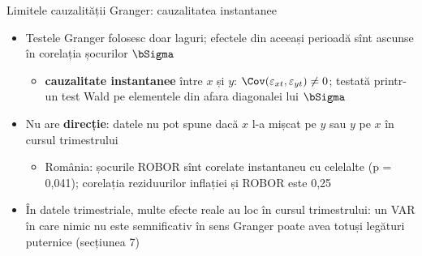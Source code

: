 \begin{frame}{Limitele cauzalității Granger: cauzalitatea instantanee}
\itemsize{\small}
\begin{itemize}
    \item Testele Granger folosesc doar laguri; efectele din aceeași perioadă sînt ascunse în corelația șocurilor $\bSigma$
    \begin{itemize}
        \item \textbf{cauzalitate instantanee} între $x$ și $y$: $\Cov(\varepsilon_{xt}, \varepsilon_{yt}) \ne 0$; testată printr-un test Wald pe elementele din afara diagonalei lui $\bSigma$
    \end{itemize}
    \item Nu are \textbf{direcție}: datele nu pot spune dacă $x$ l-a mișcat pe $y$ sau $y$ pe $x$ în cursul trimestrului
    \begin{itemize}
        \item România: șocurile ROBOR sînt corelate instantaneu cu celelalte (p = 0{,}041); corelația reziduurilor inflației și ROBOR este 0{,}25
    \end{itemize}
    \item În datele trimestriale, multe efecte reale au loc în cursul trimestrului: un VAR în care nimic nu este semnificativ în sens Granger poate avea totuși legături puternice (secțiunea 7)
\end{itemize}
\end{frame}

